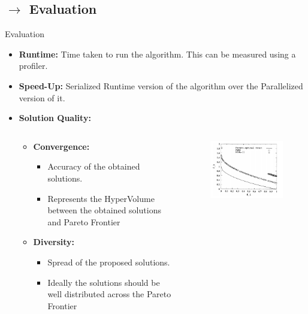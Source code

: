 \documentclass[10pt]{beamer}
\begin{document}
\subsection{$\rightarrow$ Evaluation}
\begin{frame}{Evaluation}
    \begin{itemize}
    \item<1-> \textbf{Runtime:} Time taken to run the algorithm. This can be measured using a profiler.
    \item<2-> \textbf{Speed-Up:} Serialized Runtime version of the algorithm over the Parallelized version of it.
    \item<3-> \textbf{Solution Quality:}
    \begin{columns}[t]
    \begin{column}{0.6\linewidth}
    \begin{itemize}
    \item<4-> \textbf{Convergence:}
        \begin{itemize}
            \item<4-> Accuracy of the obtained solutions.
            \item<4-> Represents the HyperVolume between the obtained solutions and Pareto Frontier
        \end{itemize}
    \item<5-> \textbf{Diversity:}
        \begin{itemize}
            \item<5-> Spread of the proposed solutions.
            \item<5-> Ideally the solutions should be well distributed across the Pareto Frontier
        \end{itemize}
    \end{itemize}
    \end{column}
    \begin{column}{0.4\linewidth}
        \begin{figure}
            \centering
            \includegraphics[scale=0.35]{figures/conv_div}
            \label{fig:conv_div}
        \end{figure}
    \end{column}
    \end{columns}
    \end{itemize}
\end{frame}
\end{document}
